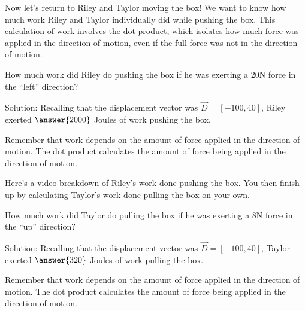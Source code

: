 \documentclass{ximera}
\begin{document}
Now let's return to Riley and Taylor moving the box! We want to know how much work Riley and Taylor individually did while pushing the box. This calculation of work involves the dot product, which isolates how much force was applied in the direction of motion, even if the full force was not in the direction of motion.

\begin{problem}
    How much work did Riley do pushing the box if he was exerting a 20N force in the ``left'' direction?

    Solution: Recalling that the displacement vector was $\vec{D}=[-100,40]$, Riley exerted $\answer{2000}$ Joules of work pushing the box.

    \begin{feedback}
        Remember that work depends on the amount of force applied in the direction of motion. The dot product calculates the amount of force being applied in the direction of motion.
    \end{feedback}
\end{problem}

Here's a video breakdown of Riley's work done pushing the box. You then finish up by calculating Taylor's work done pulling the box on your own.

\begin{center}
\end{center}

\begin{problem}
    How much work did Taylor do pulling the box if he was exerting a 8N force in the ``up'' direction?

    Solution: Recalling that the displacement vector was $\vec{D}=[-100,40]$, Taylor exerted $\answer{320}$ Joules of work pulling the box.

        \begin{feedback}
        Remember that work depends on the amount of force applied in the direction of motion. The dot product calculates the amount of force being applied in the direction of motion.
    \end{feedback}
\end{problem}
\end{document}
